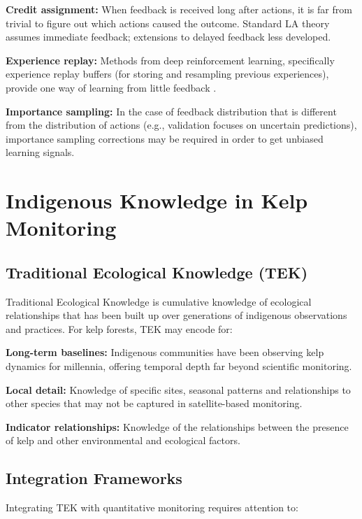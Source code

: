 \documentclass[12pt,oneside]{book}
\begin{document}
\textbf{Credit assignment:} When feedback is received long after actions, it is far from trivial to figure out which actions caused the outcome. Standard LA theory assumes immediate feedback; extensions to delayed feedback less developed.

\textbf{Experience replay:} Methods from deep reinforcement learning, specifically experience replay buffers (for storing and resampling previous experiences), provide one way of learning from little feedback \citep{SuttonBarto1998}.

\textbf{Importance sampling:} In the case of feedback distribution that is different from the distribution of actions (e.g., validation focuses on uncertain predictions), importance sampling corrections may be required in order to get unbiased learning signals.

\section{Indigenous Knowledge in Kelp Monitoring}
\label{sec:lit-tek}

\subsection{Traditional Ecological Knowledge (TEK)}
\label{subsec:tek}

Traditional Ecological Knowledge is cumulative knowledge of ecological relationships that has been built up over generations of indigenous observations and practices. For kelp forests, TEK may encode for:

\textbf{Long-term baselines:} Indigenous communities have been observing kelp dynamics for millennia, offering temporal depth far beyond scientific monitoring.

\textbf{Local detail:} Knowledge of specific sites, seasonal patterns and relationships to other species that may not be captured in satellite-based monitoring.

\textbf{Indicator relationships:} Knowledge of the relationships between the presence of kelp and other environmental and ecological factors.

\subsection{Integration Frameworks}
\label{subsec:tek-frameworks}

Integrating TEK with quantitative monitoring requires attention to:
\end{document}
